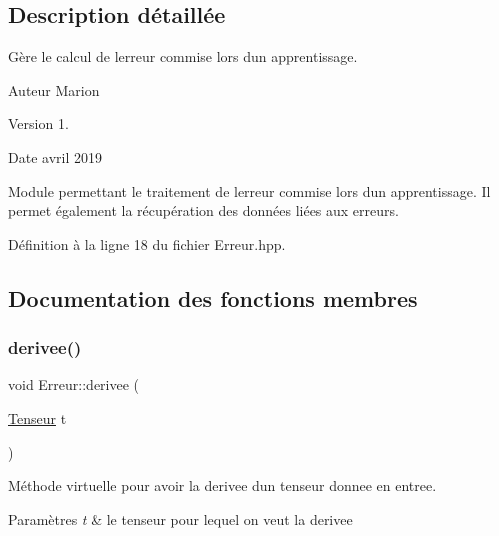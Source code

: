 \subsection{Description détaillée}
Gère le calcul de l\textquotesingle{}erreur commise lors d\textquotesingle{}un apprentissage. 

\begin{DoxyAuthor}{Auteur}
Marion 
\end{DoxyAuthor}
\begin{DoxyVersion}{Version}
1. 
\end{DoxyVersion}
\begin{DoxyDate}{Date}
avril 2019
\end{DoxyDate}
Module permettant le traitement de l\textquotesingle{}erreur commise lors d\textquotesingle{}un apprentissage. Il permet également la récupération des données liées aux erreurs. 

Définition à la ligne 18 du fichier Erreur.\+hpp.



\subsection{Documentation des fonctions membres}
\mbox{\label{class_erreur_ad56634307e3ceb8ab5c2fddede28422a}} 
\subsubsection{\texorpdfstring{derivee()}{derivee()}}
{\footnotesize\ttfamily void Erreur\+::derivee (\begin{DoxyParamCaption}\item[{\hyperlink{class_tenseur}{Tenseur}}]{t }\end{DoxyParamCaption})\hspace{0.3cm}{\ttfamily [virtual]}}



Méthode virtuelle pour avoir la derivee d\textquotesingle{}un tenseur donnee en entree. 


\begin{DoxyParams}{Paramètres}
{\em t} & le tenseur pour lequel on veut la derivee \\
\hline
\end{DoxyParams}
\mbox{\label{class_erreur_a0def45df23074388e2a338145aeb4660}} 
